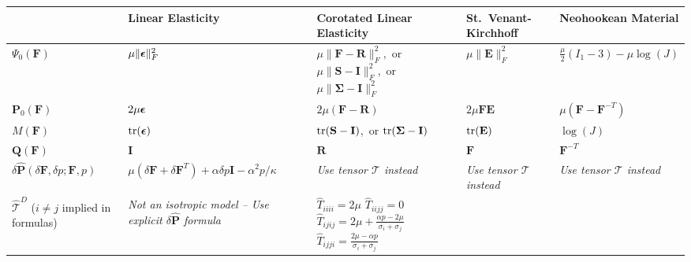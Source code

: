 \begin{landscape}

\begin{table}[h]
\centering
\begin{tabular}{|C{1in}|C{1.75in}|C{1.75in}|C{1.75in}|C{1.75in}|}
\hline
\newline& Linear Elasticity & Corotated Linear Elasticity & St.\ Venant-Kirchhoff  & Neohookean Material \\
\hline
\hline
$\Psi_0(\mathbf{F})$
	& $\mu\|\hbox{\boldmath $\epsilon$}\|_F^2$
		&  \newline $\mu\|\mathbf{F}-\mathbf{R}\|_F^2$\mbox{\small, or} \newline$\mu\|\mathbf{S}-\mathbf{I}\|_F^2$\mbox{\small, or} $\mu\|\mathbf{\Sigma}-\mathbf{I}\|_F^2$ \newline
			& $\mu\|\mathbf{E}\|_F^2$
				& $\frac{\mu}{2}(I_1-3)-\mu\log(J)$ \\
\hline
$\mathbf{P}_0(\mathbf{F})$
	& $2\mu\hbox{\boldmath $\epsilon$}$
		&  $2\mu(\mathbf{F}-\mathbf{R})$
			& $2\mu\mathbf{FE}$
				& \newline $\mu(\mathbf{F}-\mathbf{F}^{-T})$ \newline \\
\hline
$M(\mathbf{F})$
	& $\mbox{tr}(\hbox{\boldmath $\epsilon$})$
		&   \newline $\mbox{tr}(\mathbf{S}-\mathbf{I})$\mbox{\small, or} $\mbox{tr}(\mathbf{\Sigma}-\mathbf{I})$\newline
			& $\mbox{tr}(\mathbf{E})$
				& $\log(J)$ \\
\hline
$\mathbf{Q}(\mathbf{F})$
	& \newline $\mathbf{I}$  \newline
		&  $\mathbf{R}$
			& $\mathbf{F}$
				& $\mathbf{F}^{-T}$ \\
\hline
$\delta\mathbf{\hat{P}}(\delta\mathbf{F},\delta p;\mathbf{F},p)$
	& \newline $\mu(\delta\mathbf{F}+\delta\mathbf{F}^T)+\alpha\delta p\mathbf{I}-\alpha^2p/\kappa$  \newline
		&  \emph{Use tensor $\mathcal{T}$ instead}
			& \emph{Use tensor $\mathcal{T}$ instead}
				& \emph{Use tensor $\mathcal{T}$ instead} \\
\hline
$\hat{\mathcal{T}}^D$ \newline ($i\ne j$ implied \newline in  formulas)
	& \emph{Not an isotropic model -- Use explicit $\delta\mathbf{\hat{P}}$ formula}
		&  \newline $\hat{T}_{iiii}=2\mu$ \newline $\hat{T}_{iijj}=0$ \newline $\hat{T}_{ijij}=2\mu+\frac{\alpha p-2\mu}{\sigma_i+\sigma_j}$ \newline  $\hat{T}_{ijji}=\frac{2\mu-\alpha p}{\sigma_i+\sigma_j}$ \newline

\end{tabular}
\end{table}
\end{landscape}
